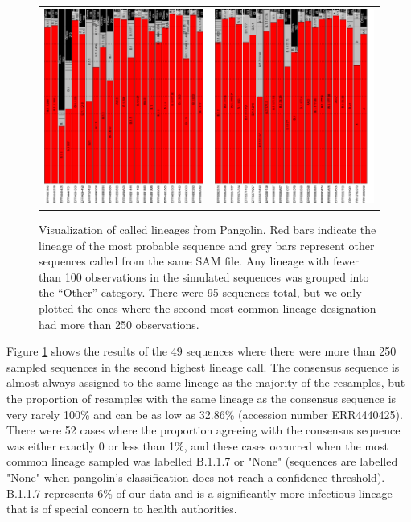 \documentclass[12pt]{article}
\begin{document}
\begin{figure}[btp]
\centering

\begin{tabular}{cc}
\includegraphics[width=0.38\linewidth, angle=-90]{figs/sampled_bars1.pdf} & \includegraphics[width=0.38\linewidth, angle=-90]{figs/sampled_bars2.pdf}\\
\end{tabular}

\caption{\label{fig:covidcalls}Visualization of called lineages from Pangolin.
Red bars indicate the lineage of the most probable sequence and grey bars represent other sequences called from the same SAM file.
Any lineage with fewer than 100 observations in the simulated sequences was grouped into the ``Other'' category.
There were 95 sequences total, but we only plotted the ones where the second most common lineage designation had more than 250 observations.}

\end{figure}


Figure \ref{fig:covidcalls} shows the results of the 49 sequences where there were more than 250 sampled sequences in the second highest lineage call.
The consensus sequence is almost always assigned to the same lineage as the majority of the resamples, but the proportion of resamples with the same lineage as the consensus sequence is very rarely 100\% and can be as low as 32.86\% (accession number ERR4440425).
There were 52 cases where the proportion agreeing with the consensus sequence was either exactly 0 or less than 1\%, and these cases occurred when the most common lineage sampled was labelled B.1.1.7 or "None" (sequences are labelled "None" when pangolin's classification does not reach a confidence threshold).
B.1.1.7 represents 6\% of our data and is a significantly more infectious lineage that is of special concern to health authorities.
\end{document}
